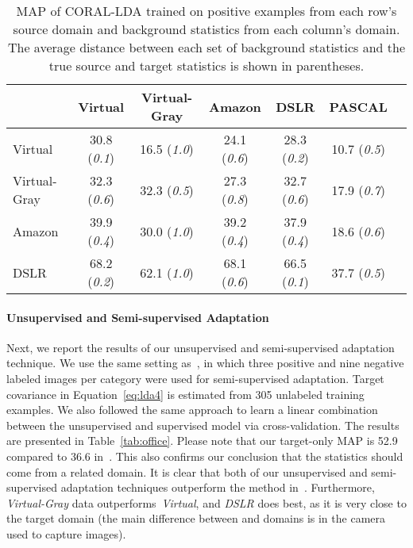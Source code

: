 \documentclass[graybox]{svmult}
\begin{document}
\begin{table}
\begin{small}
\begin{center}
\begin{tabular}{|l||c|c|c|c|c|c|}
\hline
  & Virtual & Virtual-Gray & Amazon  & DSLR & PASCAL\\ 
\hline
Virtual & 30.8 (\textit{0.1}) & 16.5 (\textit{1.0}) & 24.1 (\textit{0.6}) & 28.3 (\textit{0.2}) & 10.7 (\textit{0.5})\\ \hline
Virtual-Gray   & 32.3 (\textit{0.6}) & 32.3 (\textit{0.5}) & 27.3 (\textit{0.8}) & 32.7 (\textit{0.6}) & 17.9 (\textit{0.7})  \\ \hline
Amazon        & 39.9 (\textit{0.4}) & 30.0 (\textit{1.0}) & 39.2 (\textit{0.4}) & 37.9 (\textit{0.4}) & 18.6 (\textit{0.6})  \\ \hline
DSLR          &  68.2 (\textit{0.2}) & 62.1 (\textit{1.0}) & 68.1 (\textit{0.6}) & 66.5 (\textit{0.1}) & 37.7 (\textit{0.5})  \\ \hline
\end{tabular}
\end{center}
\caption{\small MAP of CORAL-LDA trained on positive examples from each row's source domain and background statistics from each column's domain. The average distance between each set of background statistics and the true source and target statistics is shown in parentheses. }\label{chap4_tab:performance}
\end{small}
\end{table}

\paragraph{\textbf{Unsupervised and Semi-supervised Adaptation}}
Next, we report the results of our unsupervised and semi-supervised adaptation technique. 
We use the same setting as~\cite{ICRA14}, in which three positive and nine negative labeled images per category were used for semi-supervised adaptation. 
Target covariance in Equation~\ref{eq:lda4} is estimated from 305 unlabeled training examples. We also followed the same approach to learn a linear combination between the unsupervised and supervised model via cross-validation. The results are presented in Table~\ref{tab:office}. Please note that our target-only MAP is 52.9 compared to 36.6 in~\cite{ICRA14}. This also confirms our conclusion that the statistics should come from a related domain. It is clear that both of our unsupervised and semi-supervised adaptation techniques outperform the method in~\cite{ICRA14}. Furthermore, \textit{Virtual-Gray} data outperforms~\textit{Virtual}, and \textit{DSLR} does best, as it is very close to the target domain (the main difference between  and  domains is in the camera used to capture images).
\end{document}

